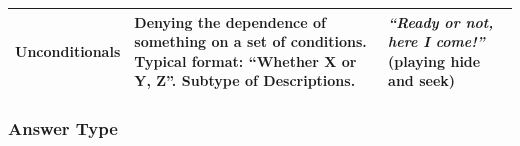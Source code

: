 \documentclass[oneside]{report}
\theoremstyle{definition}
\theoremstyle{definition}
\theoremstyle{definition}
\theoremstyle{remark}
\begin{document}
\begin{longtable}[]{@{}lll@{}}
\begin{minipage}[t]{0.14\columnwidth}
Unconditionals\strut
\end{minipage} & \begin{minipage}[t]{0.44\columnwidth}\raggedright\strut
Denying the dependence of something on a set of conditions. Typical
format: ``Whether X or Y, Z''. Subtype of Descriptions.\strut
\end{minipage} & \begin{minipage}[t]{0.33\columnwidth}\raggedright\strut
\emph{``Ready or not, here I come!''} (playing hide and seek)\strut
\end{minipage}\tabularnewline
\bottomrule
\end{longtable}
\subsubsection{Answer Type}\label{answer-type}
\end{document}
